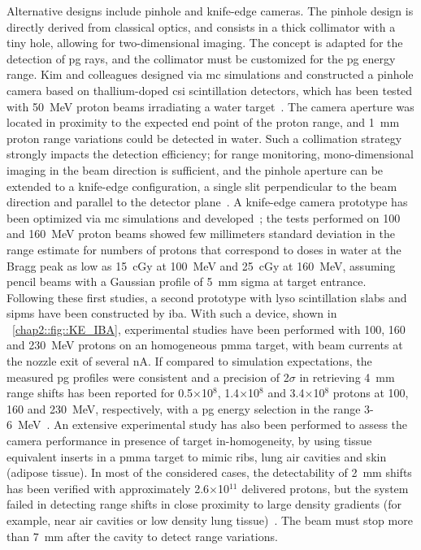 Alternative designs include pinhole and knife-edge cameras. The pinhole design is directly derived from classical optics, and consists in a thick collimator with a tiny hole, allowing for two-dimensional imaging. The concept is adapted for the detection of \gls{pg} rays, and the collimator must be customized for the \gls{pg} energy range. Kim and colleagues designed via \gls{mc} simulations and constructed a pinhole camera based on thallium-doped \gls{csi} scintillation detectors, which has been tested with 50~MeV proton beams irradiating a water target~\parencite{Kim2009}. The camera aperture was located in proximity to the expected end point of the proton range, and 1~mm proton range variations could be detected in water. Such a collimation strategy strongly impacts the detection efficiency; for range monitoring, mono-dimensional imaging in the beam direction is sufficient, and the pinhole aperture can be extended to a knife-edge configuration, a single slit perpendicular to the beam direction and parallel to the detector plane~\parencite{Bom2012}. A knife-edge camera prototype has been optimized via \gls{mc} simulations and developed~\parencite{Smeets2012}; the tests performed on 100 and 160~MeV proton beams showed few millimeters standard deviation in the range estimate for numbers of protons that correspond to doses in water at the Bragg peak as low as 15~cGy at 100~MeV and 25~cGy at 160~MeV, assuming pencil beams with a Gaussian profile of 5~mm sigma at target entrance. Following these first studies, a second prototype with \gls{lyso} scintillation slabs and \glspl{sipm} have been constructed by \gls{iba}. With such a device, shown in \figurename~\ref{chap2::fig::KE_IBA}, experimental studies have been performed with 100, 160 and 230~MeV protons on an homogeneous \gls{pmma} target, with beam currents at the nozzle exit of several nA. If compared to simulation expectations, the measured \gls{pg} profiles were consistent and a precision of 2$\sigma$ in retrieving 4~mm range shifts has been reported for 0.5$\times$10$^8$, 1.4$\times$10$^8$ and 3.4$\times$10$^8$ protons at 100, 160 and 230~MeV, respectively, with a \gls{pg} energy selection in the range 3-6~MeV~\parencite{Perali2014}. An extensive experimental study has also been performed to assess the camera performance in presence of target in-homogeneity, by using tissue equivalent inserts in a \gls{pmma} target to mimic ribs, lung air cavities and skin (adipose tissue). In most of the considered cases, the detectability of 2~mm shifts has been verified with approximately 2.6$\times$10$^{11}$ delivered protons, but the system failed in detecting range shifts in close proximity to large density gradients (for example, near air cavities or low density lung tissue)~\parencite{Priegnitz2015}. The beam must stop more than 7~mm after the cavity to detect range variations.   

